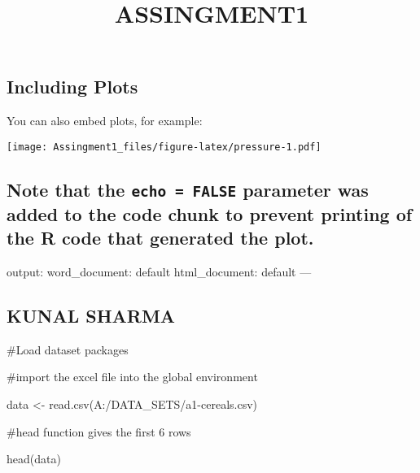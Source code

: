 \documentclass[]{article}
\title{ASSINGMENT1}
\author{}
\date{}
\newenvironment{Shaded}{\begin{snugshade}}{\end{snugshade}}
\newcommand{\FunctionTok}[1]{\textcolor[rgb]{0.00,0.00,0.00}{#1}}
\newcommand{\NormalTok}[1]{#1}
\newcommand{\OtherTok}[1]{\textcolor[rgb]{0.56,0.35,0.01}{#1}}
\newcommand{\StringTok}[1]{\textcolor[rgb]{0.31,0.60,0.02}{#1}}
\begin{document}
\maketitle

\hypertarget{including-plots}{%
\subsection{Including Plots}\label{including-plots}}

You can also embed plots, for example:

\texttt{[image: Assingment1\_files/figure-latex/pressure-1.pdf]}

\hypertarget{note-that-the-echo-false-parameter-was-added-to-the-code-chunk-to-prevent-printing-of-the-r-code-that-generated-the-plot.}{%
\subsection{\texorpdfstring{Note that the \texttt{echo\ =\ FALSE}
parameter was added to the code chunk to prevent printing of the R code
that generated the
plot.}{Note that the echo = FALSE parameter was added to the code chunk to prevent printing of the R code that generated the plot.}}\label{note-that-the-echo-false-parameter-was-added-to-the-code-chunk-to-prevent-printing-of-the-r-code-that-generated-the-plot.}}

output: word\_document: default html\_document: default ---

\hypertarget{kunal-sharma}{%
\subsection{KUNAL SHARMA}\label{kunal-sharma}}

\#Load dataset packages

\#import the excel file into the global environment

\begin{Shaded}
\begin{Highlighting}[]
\NormalTok{data }\OtherTok{\textless{}{-}} \FunctionTok{read.csv}\NormalTok{(}\StringTok{\textquotesingle{}A:/DATA\_SETS/a1{-}cereals.csv\textquotesingle{}}\NormalTok{)}
\end{Highlighting}
\end{Shaded}

\#head function gives the first 6 rows

\begin{Shaded}
\begin{Highlighting}[]
\FunctionTok{head}\NormalTok{(data)}
\end{Highlighting}
\end{Shaded}
\end{document}
